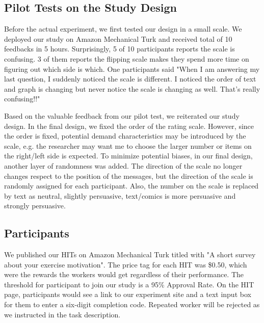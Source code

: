 \subsection{Pilot Tests on the Study Design}
Before the actual experiment, we first tested our design in a small scale. We deployed our study on Amazon Mechanical Turk and received total of 10 feedbacks in 5 hours. Surprisingly, 5 of 10 participants reports the scale is confusing. 3 of them reports the flipping scale makes they spend more time on figuring out which side is which. One participants said "When I am answering my last question, I suddenly noticed the scale is different. I noticed the order of text and graph is changing but never notice the scale is changing as well. That's really confusing!!"\par
Based on the valuable feedback from our pilot test, we reiterated our study design. In the final design, we fixed the order of the rating scale. However, since the order is fixed, potential demand characteristics may be introduced by the scale, e.g. the researcher may want me to choose the larger number or items on the right/left side is expected. To minimize potential biases, in our final design, another layer of randomness was added.  The direction of the scale no longer changes respect to the position of the messages, but the direction of the scale is randomly assigned for each participant. Also, the number on the scale is replaced by text as neutral, slightly persuasive, text/comics is more persuasive and strongly persuasive.
\subsection{Participants}
We published our HITs on Amazon Mechanical Turk titled with "A short survey about your exercise motivation". The price tag for each HIT was \$0.50, which were the rewards the workers would get regardless of their performance. The threshold for participant to join our study is a 95\% Approval Rate. On the HIT page, participants would see a link to our experiment site and a text input box for them to enter a six-digit completion code. Repeated worker will be rejected as we instructed in the task description.
